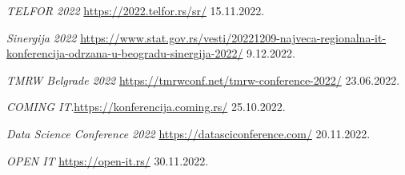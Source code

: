 \documentclass[12pt]{article}
\begin{document}
\iffalse


\fi

\begin{thebibliography}{9}
 \emph{TELFOR 2022} \url{https://2022.telfor.rs/sr/} 15.11.2022.

 \emph{Sinergija 2022} \url{https://www.stat.gov.rs/vesti/20221209-najveca-regionalna-it-konferencija-odrzana-u-beogradu-sinergija-2022/} 9.12.2022.

 \emph{TMRW Belgrade 2022} \url{https://tmrwconf.net/tmrw-conference-2022/} 23.06.2022.

 \emph{COMING IT}.\url{https://konferencija.coming.rs/} 25.10.2022.


 \emph{Data Science Conference 2022} \url{https://datasciconference.com/} 20.11.2022.

 \emph{OPEN IT} \url{https://open-it.rs/} 30.11.2022.

\end{thebibliography}

\appendix
\end{document}
